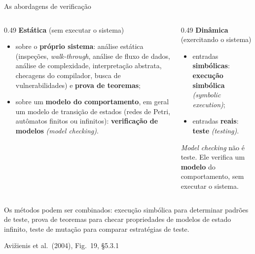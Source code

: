 \documentclass{beamer}
\newcommand{\en}[1]{{\color{depCinza}\textit{#1}}}
\newcommand{\sect}[1]{\par\smallskip\hfill{\tiny\color{black!55}Avi\v{z}ienis et al.\ (2004), #1}}
\begin{document}
\begin{frame}{As abordagens de verifica\c{c}\~ao}
    \centering
    \diagVerificacao
    \vspace{0.1em}
    \scriptsize
    \begin{columns}[T]
        \begin{column}{0.49\textwidth}
            \textbf{Est\'atica} (sem executar o sistema)
            \begin{itemize}
                \item sobre o \textbf{pr\'oprio sistema}: an\'alise est\'atica (inspe\c{c}\~oes, \textit{walk-through}, an\'alise de fluxo de dados, an\'alise de complexidade, interpreta\c{c}\~ao abstrata, checagens do compilador, busca de vulnerabilidades) e \textbf{prova de teoremas};
                \item sobre um \textbf{modelo do comportamento}, em geral um modelo de transi\c{c}\~ao de estados (redes de Petri, aut\^omatos finitos ou infinitos): \textbf{verifica\c{c}\~ao de modelos} \en{(model checking)}.
            \end{itemize}
        \end{column}
        \begin{column}{0.49\textwidth}
            \textbf{Din\^amica} (exercitando o sistema)
            \begin{itemize}
                \item entradas \textbf{simb\'olicas}: \textbf{execu\c{c}\~ao simb\'olica} \en{(symbolic execution)};
                \item entradas \textbf{reais}: \textbf{teste} \en{(testing)}.
            \end{itemize}
            \smallskip
            \begin{armadilha}
                \scriptsize
                \textit{Model checking} n\~ao \'e teste. Ele verifica um \textbf{modelo} do comportamento, sem executar o sistema.
            \end{armadilha}
        \end{column}
    \end{columns}
    \smallskip
    {\scriptsize Os m\'etodos podem ser combinados: execu\c{c}\~ao simb\'olica para determinar padr\~oes de teste, prova de teoremas para checar propriedades de modelos de estado infinito, teste de muta\c{c}\~ao para comparar estrat\'egias de teste.}
    \sect{Fig.\ 19, \S5.3.1}
\end{frame}
\end{document}
